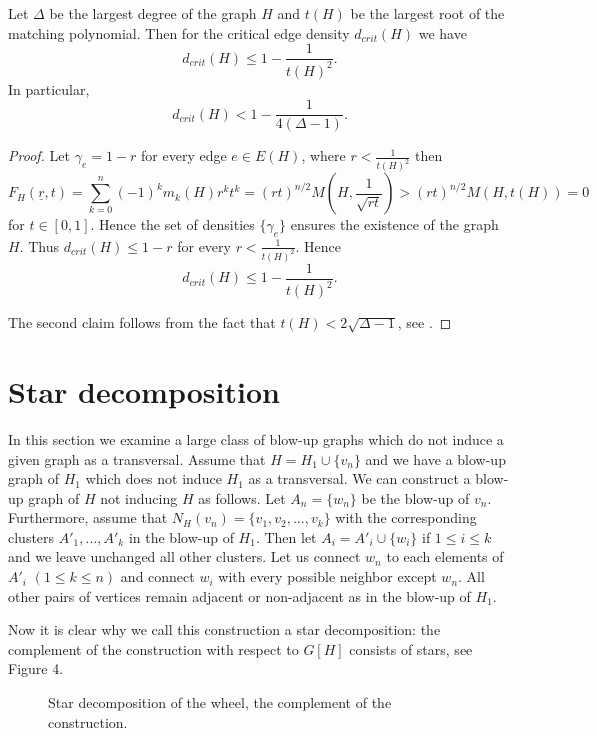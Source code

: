 \documentclass[12pt,a4paper]{amsart}
\numberwithin{equation}{section}
\begin{document}
\begin{cor} Let $\Delta$ be the largest degree of the graph $H$ and $t(H)$ be
  the largest root of the matching polynomial. Then for the
  critical edge density $d_{crit}(H)$ we have 
$$d_{crit}(H)\leq 1-\frac{1}{t(H)^2}.$$
In particular,
$$d_{crit}(H)<1-\frac{1}{4(\Delta-1)}.$$
\end{cor}

\begin{proof} Let $\gamma_e=1-r$ for every edge $e\in E(H)$, where
  $r<\frac{1}{t(H)^2}$ then 
$$F_H(\underline{r},t)=\sum_{k=0}^n(-1)^km_k(H)r^kt^k=(rt)^{n/2}M(H,\frac{1}{\sqrt{rt}})>(rt)^{n/2}M(H,t(H))=0$$ 
for $t\in [0,1]$.  Hence the set of densities $\{\gamma_e\}$ ensures the
existence of the graph $H$. Thus $d_{crit}(H)\leq 1-r$ for every
$r<\frac{1}{t(H)^2}$. Hence 
$$d_{crit}(H)\leq 1-\frac{1}{t(H)^2}.$$

The second claim follows from the fact that $t(H)< 2\sqrt{\Delta-1}$, see \cite{lieb}.
\end{proof}

\section{Star decomposition} 

In this section we examine a large class of blow-up graphs which do not
induce a given graph as a transversal. Assume that $H=H_1\cup \{v_n\}$ and we
have a blow-up graph of $H_1$ which does not induce $H_1$ as a transversal.
We can construct a blow-up graph of $H$ not inducing $H$ as follows. Let
$A_n=\{w_n\}$ be the blow-up of $v_n$. Furthermore, assume that
$N_H(v_n)=\{v_1,v_2,\dots ,v_k\}$ with the corresponding clusters
$A'_1,\dots ,A'_k$ in the blow-up of $H_1$. Then let $A_i=A'_i\cup \{w_i\}$
if $1\leq i\leq k$ and we leave unchanged all other clusters. Let us connect
$w_n$ to each elements of $A'_i$ $(1\leq k\leq n)$ and connect $w_i$ with
every possible neighbor except $w_n$. All other pairs of vertices remain
adjacent or non-adjacent as in the blow-up of $H_1$. 

Now it is clear why we call this construction a star decomposition: 
the complement of the construction with respect to $G[H]$ consists of stars,
see Figure 4. 

\begin{figure}[h!]
\begin{center}
 \caption{Star decomposition
  of the wheel, the complement of the construction.} 
\end{center}
\end{figure} 
    
\end{document}
